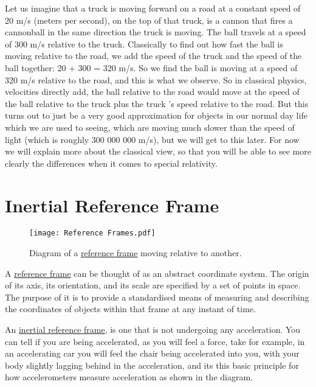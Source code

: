 Let us imagine that a truck is moving forward on a road at a constant speed of 20 m/s (meters per second), on the top of that truck, is a cannon that fires a cannonball in the same direction the truck is moving. The ball travels at a speed of 300 m/s relative to the truck. Classically to find out how fast the ball is moving relative to the road, we add the speed of the truck and the speed of the ball together: 20 + 300 = 320 m/s. So we find the ball is moving at a speed of 320 m/s relative to the road, and this is what we observe. So in classical physics, velocities directly add, the ball relative to the road would move at the speed of the ball relative to the truck plus the truck 's speed relative to the road. 
But this turns out to just be a very good approximation for objects in our normal day life which we are used to seeing, which are moving much slower than the speed of light (which is roughly 300 000 000 m/s), but we will get to this later. For now we will explain more about the classical view, so that you will be able to see more clearly the differences when it comes to special relativity.

\section{Inertial Reference Frame}



\begin{figure}[H]
    \centering
    \texttt{[image: Reference Frames.pdf]}
    \caption{Diagram of a \protect\hyperlink{def-Reference-frame}{reference frame} moving relative to another.}
    \label{fig:Reference Frames}
\end{figure}


A \hyperlink{def-Reference-frame}{reference frame} can be thought of as an abstract coordinate system. The origin of its axis, its orientation, and its scale are specified by a set of points in space. The purpose of it is to provide a standardised means of measuring and describing the coordinates of objects within that frame at any instant of time.

An \hyperlink{def-Inertial-reference-frame}{inertial reference frame}, is one that is not undergoing any acceleration. You can tell if you are being accelerated, as you will feel a force, take for example, in an accelerating car you will feel the chair being accelerated into you, with your body slightly lagging behind in the acceleration, and its this basic principle for how accelerometers measure acceleration as shown in the diagram. 


